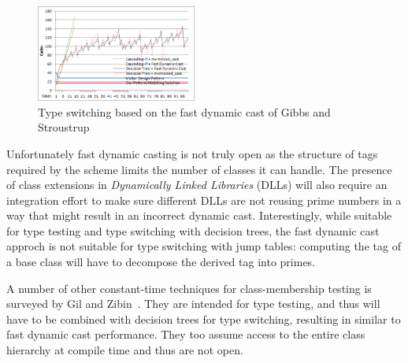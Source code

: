 \begin{figure}[htbp]
  \centering
    \includegraphics[width=0.47\textwidth]{DCast-vs-Visitors2.png}
  \caption{Type switching based on the fast dynamic cast of Gibbs and Stroustrup~\cite{FastDynCast}}
  \label{fig:DCastVis2}
\end{figure}


Unfortunately fast dynamic casting is not truly open as the structure of tags 
required by the scheme limits the number of classes it can handle. 
The presence of class extensions in \emph{Dynamically Linked Libraries} (DLLs) 
will also require an integration effort to make sure different DLLs are not 
reusing prime numbers in a way that might result in an incorrect dynamic cast.
Interestingly, while suitable for type testing and type switching with decision 
trees, the fast dynamic cast approch is not suitable for type switching with 
jump tables: computing the tag of a base class will have to decompose the 
derived tag into primes.

A number of other constant-time techniques for class-membership testing is 
surveyed by Gil and Zibin~\cite[]{PQEncoding}. They are intended 
for type testing, and thus will have to be combined with decision trees 
for type switching, resulting in similar to fast dynamic cast performance. 
They too assume access to the entire class hierarchy at compile time and thus 
are not open.

